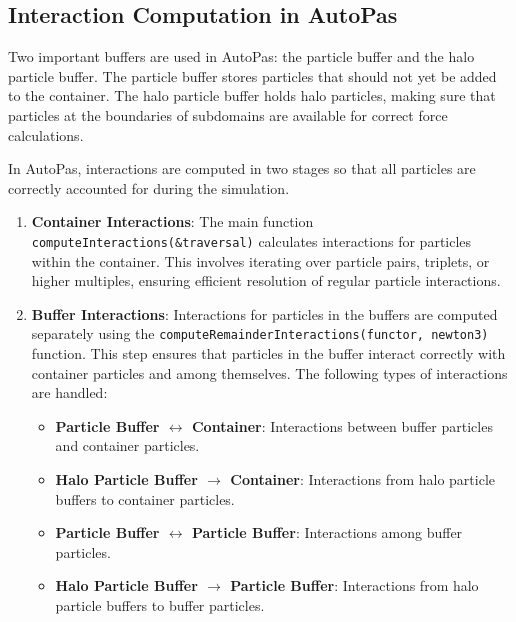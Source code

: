 \subsection{Interaction Computation in AutoPas} \label{sec:interaction_comp}

Two important buffers are used in AutoPas: the particle buffer and the halo particle buffer. The particle buffer stores particles that should not yet be added to the container. The halo particle buffer holds halo particles, making sure that particles at the boundaries of subdomains are available for correct force calculations.


In AutoPas, interactions are computed in two stages so that all particles are correctly accounted for during the simulation.

\begin{enumerate}
    \item \textbf{Container Interactions}: The main function \texttt{computeInteractions(\&traversal)} calculates interactions for particles within the container. This involves iterating over particle pairs, triplets, or higher multiples, ensuring efficient resolution of regular particle interactions.

    \item \textbf{Buffer Interactions}: Interactions for particles in the buffers are computed separately using the \texttt{computeRemainderInteractions(functor, newton3)} function. This step ensures that particles in the buffer interact correctly with container particles and among themselves. The following types of interactions are handled:
    \begin{itemize}
        \item \textbf{Particle Buffer \(\leftrightarrow\) Container}: Interactions between buffer particles and container particles.
        \item \textbf{Halo Particle Buffer \(\rightarrow\) Container}: Interactions from halo particle buffers to container particles.
        \item \textbf{Particle Buffer \(\leftrightarrow\) Particle Buffer}: Interactions among buffer particles.
        \item \textbf{Halo Particle Buffer \(\rightarrow\) Particle Buffer}: Interactions from halo particle buffers to buffer particles.
    \end{itemize}
\end{enumerate}



